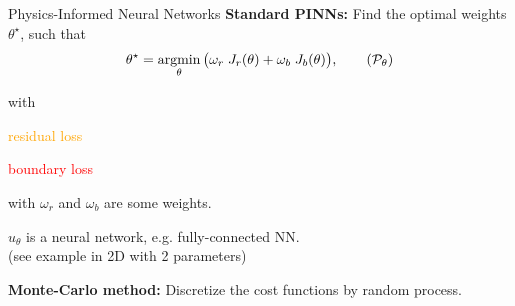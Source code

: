 
\begin{frame}{Physics-Informed Neural Networks}
	\textbf{Standard PINNs:} Find the optimal weights $\theta^\star$, such that
	\begin{equation}
		\label{eq:opt_pb}
		\theta^\star = \argmin_{\theta}	\big( \omega_r \; J_r(\theta) + \omega_b \; J_b(\theta) \big),
		\tag{$\mathcal{P}_\theta$}
	\end{equation}

	\vspace{-5pt}
	with
	\vspace{-6pt}

	\hspace{15pt}\begin{minipage}{0.2\linewidth}
		\flushright
		\textcolor{orange}{residual loss}

		\vspace{12pt}
		\textcolor{red}{boundary loss}
	\end{minipage}
	\begin{minipage}{0.58\linewidth}
		\centering
		
		\vspace{3pt}
	\end{minipage}
	
	\vspace{5pt}
	\begin{minipage}{0.55\linewidth}
		with $\omega_r$ and $\omega_b$ are some weights.
		
		\vspace{12pt}
		$u_\theta$ is a neural network, e.g. fully-connected NN. \\
		(see example in 2D with 2 parameters)
	\end{minipage} \hfill
	\begin{minipage}{0.38\linewidth}
		\flushright
	\end{minipage}
	\vspace{5pt}
	\textbf{Monte-Carlo method:} Discretize the cost functions by random process.
	\vspace{3pt}
\end{frame}

